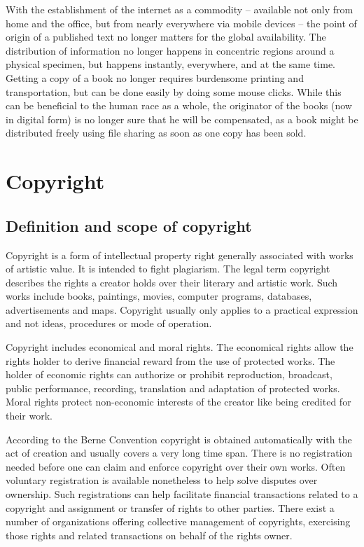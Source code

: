 \documentclass[a4paper]{report}
\begin{document}
With the establishment of the internet as a commodity -- available not only from home and the office, but from nearly everywhere via mobile devices -- the point of origin of a published text no longer matters for the global availability. The distribution of information no longer happens in concentric regions around a physical specimen, but happens instantly, everywhere, and at the same time. Getting a copy of a book no longer requires burdensome printing and transportation, but can be done easily by doing some mouse clicks. While this can be beneficial to the human race as a whole, the originator of the books (now in digital form) is no longer sure that he will be compensated, as a book might be distributed freely using file sharing as soon as one copy has been sold.

\section{Copyright}
\label{sec:Copyright}

\subsection{Definition and scope of copyright}
\label{sec:CopyDef}
Copyright is a form of intellectual property right generally associated with works of artistic value. It is intended to fight plagiarism. The legal term copyright describes the rights a creator holds over their literary and artistic work. Such works include books, paintings, movies, computer programs, databases, advertisements and maps. Copyright usually only applies to a practical expression and not ideas, procedures or mode of operation. \parencite{CopyGov}

Copyright includes economical and moral rights. The economical rights allow the rights holder to derive financial reward from the use of protected works. The holder of economic rights can authorize or prohibit reproduction, broadcast, public performance, recording, translation and adaptation of protected works. Moral rights protect non-economic interests of the creator like being credited for their work. \parencite{WikiCopy}

According to the Berne Convention copyright is obtained automatically with the act of creation and usually covers a very long time span. \parencite{WikiBerne} There is no registration needed before one can claim and enforce copyright over their own works. Often voluntary registration is available nonetheless to help solve disputes over ownership. Such registrations can help facilitate financial transactions related to a copyright and assignment or transfer of rights to other parties. There exist a number of organizations offering collective management of copyrights, exercising those rights and related transactions on behalf of the rights owner.
\end{document}
